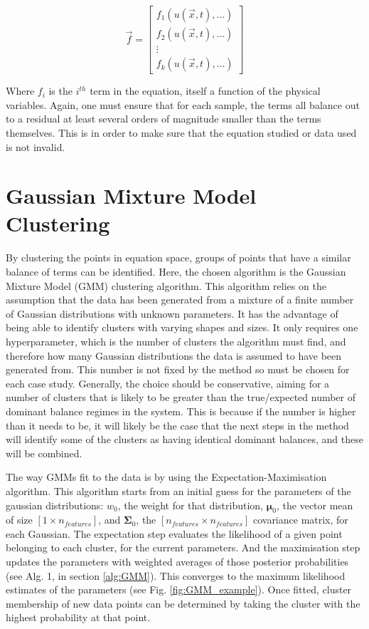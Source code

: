 \documentclass[12pt]{report} %
\begin{document}
\begin{equation}
    \vec{f} = \begin{bmatrix} f_1(u(\vec{x}, t), \hdots) \\ f_2(u(\vec{x}, t), \hdots) \\ \vdots \\ f_k(u(\vec{x}, t), \hdots) \end{bmatrix}
\end{equation}

Where $f_i$ is the $i^{th}$ term in the equation, itself a function of the physical variables. Again, one must ensure that for each sample, the terms all balance out to a residual at least several orders of magnitude smaller than the terms themselves. This is in order to make sure that the equation studied or data used is not invalid.


\section{Gaussian Mixture Model Clustering}

By clustering the points in equation space, groups of points that have a similar balance of terms can be identified. Here, the chosen algorithm is the Gaussian Mixture Model (GMM) clustering algorithm. This algorithm relies on the assumption that the data has been generated from a mixture of a finite number of Gaussian distributions with unknown parameters\cite{mit2015algorithmic}. It has the advantage of being able to identify clusters with varying shapes and sizes. It only requires one hyperparameter, which is the number of clusters the algorithm must find, and therefore how many Gaussian distributions the data is assumed to have been generated from\cite{sklearnGMM}. This number is not fixed by the method so must be chosen for each case study. Generally, the choice should be conservative, aiming for a number of clusters that is likely to be greater than the true/expected number of dominant balance regimes in the system. This is because if the number is higher than it needs to be, it will likely be the case that the next steps in the method will identify some of the clusters as having identical dominant balances, and these will be combined.

\vspace{5mm}

The way GMMs fit to the data is by using the Expectation-Maximisation algorithm. This algorithm starts from an initial guess for the parameters of the gaussian distributions: $w_0$, the weight for that distribution, $\mathbf{\mu}_{0}$, the vector mean of size $[1 \times n_{features}]$, and $\mathbf{\Sigma}_{0}$, the $[n_{features} \times n_{features}]$ covariance matrix, for each Gaussian. The expectation step evaluates the likelihood of a given point belonging to each cluster, for the current parameters. And the maximisation step updates the parameters with weighted averages of those posterior probabilities\cite{dempster1977maximum} (see Alg. 1, in section \ref{alg:GMM}). This converges to the maximum likelihood estimates of the parameters (see Fig. \ref{fig:GMM_example}). Once fitted, cluster membership of new data points can be determined by taking the cluster with the highest probability at that point.
\end{document}
